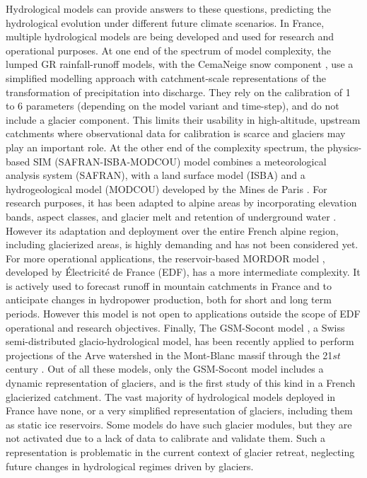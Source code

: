 Hydrological models can provide answers to these questions, predicting the hydrological evolution under different future climate scenarios. In France, multiple hydrological models are being developed and used for research and operational purposes. At one end of the spectrum of model complexity, the lumped GR rainfall-runoff models, with the CemaNeige snow component \citep{coron_suite_2017}, use a simplified modelling approach with catchment-scale representations of the transformation of precipitation into discharge. They rely on the calibration of 1 to 6 parameters (depending on the model variant and time-step), and do not include a glacier component. This limits their usability in high-altitude, upstream catchments where observational data for calibration is scarce and glaciers may play an important role.  At the other end of the complexity spectrum, the physics-based SIM (SAFRAN-ISBA-MODCOU) model combines a meteorological analysis system (SAFRAN), with a land surface model (ISBA) and a hydrogeological model (MODCOU) developed by the Mines de Paris \citep{habets_safran-isba-modcou_2008}. For research purposes, it has been adapted to alpine areas by incorporating elevation bands, aspect classes, and  glacier melt and retention of underground water \citep{lafaysse_influence_2011}. However its adaptation and deployment over the entire French alpine region, including glacierized areas, is highly demanding \citep[e.g.][]{lecourt_physically-based_2018} and has not been considered yet. For more operational applications, the reservoir-based MORDOR model \citep{paquet_evolution_2004}, developed by Électricité de France (EDF), has a more intermediate complexity. It is actively  used to forecast runoff in mountain catchments in France and to anticipate changes in hydropower production, both for short and long term periods. However this model is not open to applications outside the scope of EDF operational and research objectives. Finally, The GSM-Socont model \citep{schaefli_conceptual_2005}, a Swiss semi-distributed glacio-hydrological model, has been recently applied to perform projections of the Arve watershed in the Mont-Blanc massif through the 21${st}$ century \citep{laurent_impact_2020}. Out of all these models, only the GSM-Socont model includes a dynamic representation of glaciers, and \citet{laurent_impact_2020} is the first study of this kind in a French glacierized catchment. The vast majority of hydrological models deployed in France have none, or a very simplified representation of glaciers, including them as static ice reservoirs. Some models do have such glacier modules, but they are not activated due to a lack of data to calibrate and validate them. Such a representation is problematic in the current context of glacier retreat, neglecting future changes in hydrological regimes driven by glaciers. 

